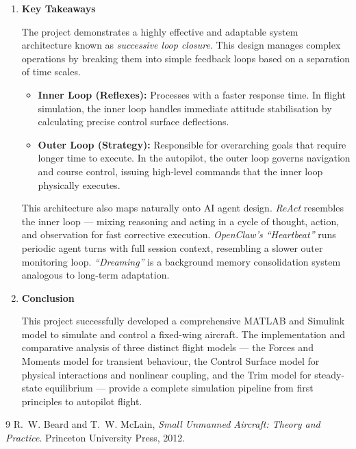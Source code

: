 \documentclass[12pt,a4paper]{article}
\begin{document}
\begin{enumerate}

\item \textbf{Key Takeaways}

The project demonstrates a highly effective and adaptable system architecture known as \textit{successive loop closure}. This design manages complex operations by breaking them into simple feedback loops based on a separation of time scales.

\begin{itemize}
    \item \textbf{Inner Loop (Reflexes):} Processes with a faster response time. In flight simulation, the inner loop handles immediate attitude stabilisation by calculating precise control surface deflections.
    \item \textbf{Outer Loop (Strategy):} Responsible for overarching goals that require longer time to execute. In the autopilot, the outer loop governs navigation and course control, issuing high-level commands that the inner loop physically executes.
\end{itemize}

This architecture also maps naturally onto AI agent design. \textit{ReAct} resembles the inner loop --- mixing reasoning and acting in a cycle of thought, action, and observation for fast corrective execution. \textit{OpenClaw's ``Heartbeat''} runs periodic agent turns with full session context, resembling a slower outer monitoring loop. \textit{``Dreaming''} is a background memory consolidation system analogous to long-term adaptation.

\item \textbf{Conclusion}

This project successfully developed a comprehensive MATLAB and Simulink model to simulate and control a fixed-wing aircraft. The implementation and comparative analysis of three distinct flight models --- the Forces and Moments model for transient behaviour, the Control Surface model for physical interactions and nonlinear coupling, and the Trim model for steady-state equilibrium --- provide a complete simulation pipeline from first principles to autopilot flight.

\end{enumerate}

\newpage
\begin{thebibliography}{9}
    R.~W. Beard and T.~W. McLain,
    \textit{Small Unmanned Aircraft: Theory and Practice}.
    Princeton University Press, 2012.
\end{thebibliography}
\end{document}
